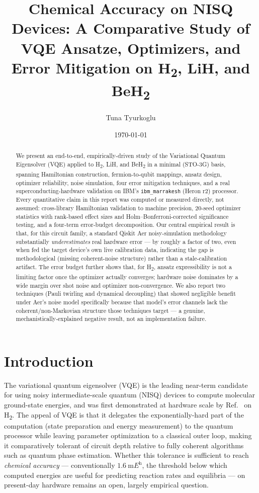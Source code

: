\documentclass[11pt]{article}
\title{Chemical Accuracy on NISQ Devices: A Comparative Study of VQE Ansatze,
Optimizers, and Error Mitigation on H\textsubscript{2}, LiH, and BeH\textsubscript{2}}
\author{Tuna Tyurkoglu}
\date{\today}
\begin{document}
\maketitle

\begin{abstract}
We present an end-to-end, empirically-driven study of the Variational Quantum
Eigensolver (VQE) applied to H\textsubscript{2}, LiH, and BeH\textsubscript{2}
in a minimal (STO-3G) basis, spanning Hamiltonian construction, fermion-to-qubit
mappings, ansatz design, optimizer reliability, noise simulation, four error
mitigation techniques, and a real superconducting-hardware validation on IBM's
\texttt{ibm\_marrakesh} (Heron r2) processor. Every quantitative claim in this
report was computed or measured directly, not assumed: cross-library
Hamiltonian validation to machine precision, 20-seed optimizer statistics with
rank-based effect sizes and Holm--Bonferroni-corrected significance testing,
and a four-term error-budget decomposition. Our central empirical result is
that, for this circuit family, a standard Qiskit Aer noisy-simulation
methodology substantially \emph{underestimates} real hardware error --- by
roughly a factor of two, even when fed the target device's own live
calibration data, indicating the gap is methodological (missing coherent-noise
structure) rather than a stale-calibration artifact. The error budget further
shows that, for H\textsubscript{2}, ansatz expressibility is not a limiting
factor once the optimizer actually converges; hardware noise dominates by a
wide margin over shot noise and optimizer non-convergence. We also report two
techniques (Pauli twirling and dynamical decoupling) that showed negligible
benefit under Aer's noise model specifically because that model's error
channels lack the coherent/non-Markovian structure those techniques target ---
a genuine, mechanistically-explained negative result, not an implementation
failure.
\end{abstract}

\section{Introduction}
\label{sec:intro}

The variational quantum eigensolver (VQE) \cite{peruzzo2014variational} is the
leading near-term candidate for using noisy intermediate-scale quantum (NISQ)
devices to compute molecular ground-state energies, and was first demonstrated
at hardware scale by Ref.~\cite{omalley2016scalable} on H\textsubscript{2}.
The appeal of VQE is that it delegates the exponentially-hard part of the
computation (state preparation and energy measurement) to the quantum
processor while leaving parameter optimization to a classical outer loop,
making it comparatively tolerant of circuit depth relative to fully coherent
algorithms such as quantum phase estimation. Whether this tolerance is
sufficient to reach \emph{chemical accuracy} --- conventionally
$\qty{1.6}{\milli\hartree}$, the threshold below which computed energies are
useful for predicting reaction rates and equilibria --- on present-day
hardware remains an open, largely empirical question.
\end{document}
